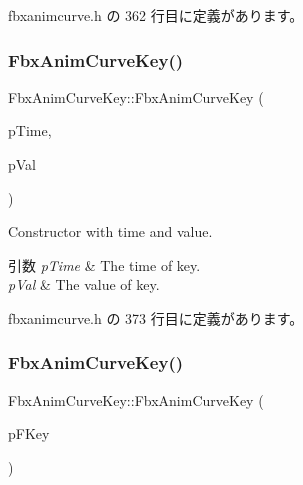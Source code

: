  fbxanimcurve.\+h の 362 行目に定義があります。

\mbox{\label{class_fbx_anim_curve_key_a3e967d8e8d05da27ba82dcebfe2533fc}} 
\subsubsection{\texorpdfstring{Fbx\+Anim\+Curve\+Key()}{FbxAnimCurveKey()}\hspace{0.1cm}{\footnotesize\ttfamily [3/4]}}
{\footnotesize\ttfamily Fbx\+Anim\+Curve\+Key\+::\+Fbx\+Anim\+Curve\+Key (\begin{DoxyParamCaption}\item[{\hyperlink{class_fbx_time}{Fbx\+Time}}]{p\+Time,  }\item[{float}]{p\+Val }\end{DoxyParamCaption})\hspace{0.3cm}{\ttfamily [inline]}}

Constructor with time and value. 
\begin{DoxyParams}{引数}
{\em p\+Time} & The time of key. \\
\hline
{\em p\+Val} & The value of key. \\
\hline
\end{DoxyParams}


 fbxanimcurve.\+h の 373 行目に定義があります。

\mbox{\label{class_fbx_anim_curve_key_ab5d7663cc4993863b80b13e0b5dca835}} 
\subsubsection{\texorpdfstring{Fbx\+Anim\+Curve\+Key()}{FbxAnimCurveKey()}\hspace{0.1cm}{\footnotesize\ttfamily [4/4]}}
{\footnotesize\ttfamily Fbx\+Anim\+Curve\+Key\+::\+Fbx\+Anim\+Curve\+Key (\begin{DoxyParamCaption}\item[{\hyperlink{class_fbx_anim_curve_key}{Fbx\+Anim\+Curve\+Key} const \&}]{p\+F\+Key }\end{DoxyParamCaption})\hspace{0.3cm}{\ttfamily [inline]}}

